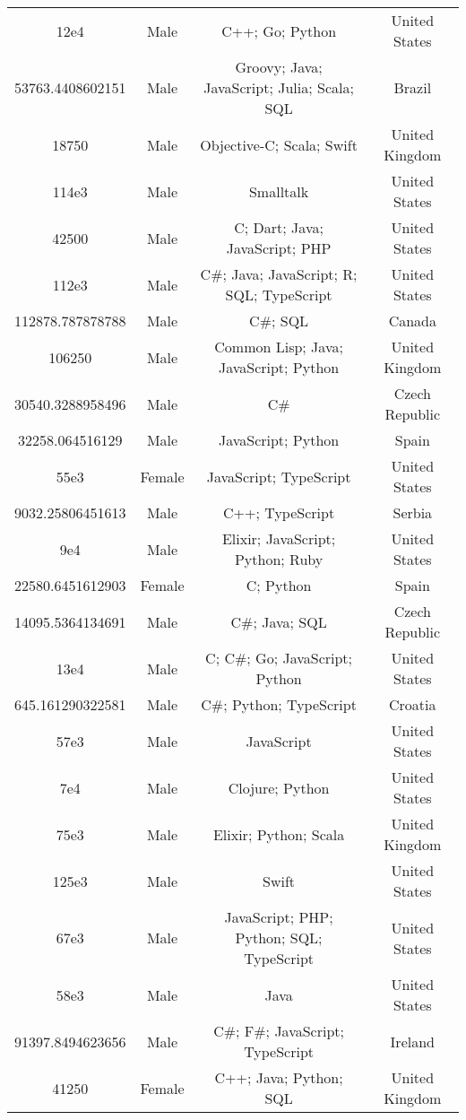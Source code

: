 \begin{center}
\begin{tabular}{ |c|c|c|c| }
12e4  &  Male  &  C++; Go; Python  &  United States  \\ 
53763.4408602151  &  Male  &  Groovy; Java; JavaScript; Julia; Scala; SQL  &  Brazil  \\ 
18750  &  Male  &  Objective-C; Scala; Swift  &  United Kingdom  \\ 
114e3  &  Male  &  Smalltalk  &  United States  \\ 
42500  &  Male  &  C; Dart; Java; JavaScript; PHP  &  United States  \\ 
112e3  &  Male  &  C\#; Java; JavaScript; R; SQL; TypeScript  &  United States  \\ 
112878.787878788  &  Male  &  C\#; SQL  &  Canada  \\ 
106250  &  Male  &  Common Lisp; Java; JavaScript; Python  &  United Kingdom  \\ 
30540.3288958496  &  Male  &  C\#  &  Czech Republic  \\ 
32258.064516129  &  Male  &  JavaScript; Python  &  Spain  \\ 
55e3  &  Female  &  JavaScript; TypeScript  &  United States  \\ 
9032.25806451613  &  Male  &  C++; TypeScript  &  Serbia  \\ 
9e4  &  Male  &  Elixir; JavaScript; Python; Ruby  &  United States  \\ 
22580.6451612903  &  Female  &  C; Python  &  Spain  \\ 
14095.5364134691  &  Male  &  C\#; Java; SQL  &  Czech Republic  \\ 
13e4  &  Male  &  C; C\#; Go; JavaScript; Python  &  United States  \\ 
645.161290322581  &  Male  &  C\#; Python; TypeScript  &  Croatia  \\ 
57e3  &  Male  &  JavaScript  &  United States  \\ 
7e4  &  Male  &  Clojure; Python  &  United States  \\ 
75e3  &  Male  &  Elixir; Python; Scala  &  United Kingdom  \\ 
125e3  &  Male  &  Swift  &  United States  \\ 
67e3  &  Male  &  JavaScript; PHP; Python; SQL; TypeScript  &  United States  \\ 
58e3  &  Male  &  Java  &  United States  \\ 
91397.8494623656  &  Male  &  C\#; F\#; JavaScript; TypeScript  &  Ireland  \\ 
41250  &  Female  &  C++; Java; Python; SQL  &  United Kingdom  \\ 

\end{tabular}
\end{center}
